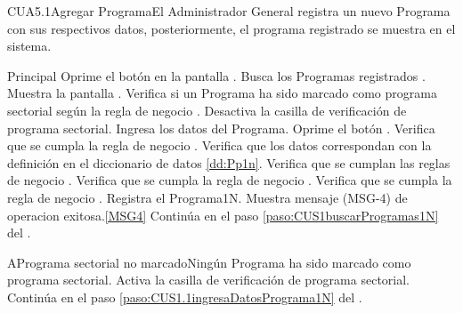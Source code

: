 	\begin{UseCase}{CUA5.1}{Agregar Programa}{El Administrador General registra un nuevo Programa con sus respectivos datos, posteriormente, el programa registrado se muestra en el sistema.}
	\end{UseCase}

	\begin{UCtrayectoria}{Principal}
		\UCpaso[\UCactor] Oprime el bot\'on  en la pantalla .
		\UCpaso Busca los Programas registrados \label{paso:CUS1.1buscaProgramas1N}.
		\UCpaso Muestra la pantalla .
		\UCpaso Verifica si un Programa ha sido marcado como programa sectorial según la regla de negocio .
		\UCpaso Desactiva la casilla de verificaci\'on de programa sectorial. 
		\UCpaso [\UCactor] Ingresa los datos del Programa.\label{paso:CUS1.1ingresaDatosPrograma1N} 
		\UCpaso [\UCactor] Oprime el bot\'on .
		\UCpaso Verifica que se cumpla la regla de negocio .
		\UCpaso Verifica que los datos correspondan con la definici\'on en el diccionario de datos \ref{dd:Pp1n}. 
		\UCpaso Verifica que se cumplan las reglas de negocio . 
		\UCpaso Verifica que se cumpla la regla de negocio .  
		\UCpaso Verifica que se cumpla la regla de negocio .  
		\UCpaso Registra el Programa1N.
                \UCpaso Muestra mensaje (MSG-4) de operacion exitosa.\ref{MSG4}
		\UCpaso Contin\'ua en el paso \ref{paso:CUS1buscarProgramas1N} del .
	\end{UCtrayectoria}

	\begin{UCtrayectoriaA}{A}{Programa sectorial no marcado}{Ning\'un Programa ha sido marcado como programa sectorial.}
		\UCpaso Activa la casilla de verificaci\'on de programa sectorial.
		\UCpaso Contin\'ua en el paso \ref{paso:CUS1.1ingresaDatosPrograma1N} del .
	\end{UCtrayectoriaA}
	
